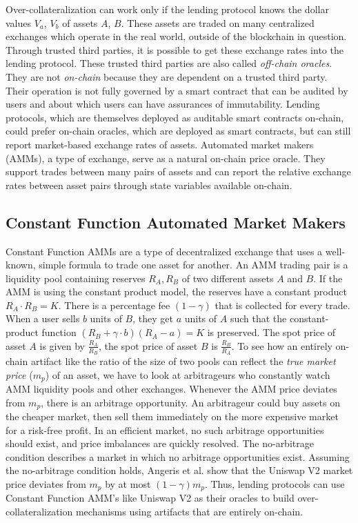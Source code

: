 Over-collateralization can work only if the lending protocol knows the dollar values $V_a$, $V_b$ of assets $A$, $B$. These assets are traded on many centralized exchanges which operate in the real world, outside of the blockchain in question. Through trusted third parties, it is possible to get these exchange rates into the lending protocol. These trusted third parties are also called \textit{off-chain oracles}. They are not \textit{on-chain} because they are dependent on a trusted third party. Their operation is not fully governed by a smart contract that can be audited by users and about which users can have assurances of immutability. Lending protocols, which are themselves deployed as auditable smart contracts on-chain, could prefer on-chain oracles, which are deployed as smart contracts, but can still report market-based exchange rates of assets. Automated market makers (AMMs), a type of exchange, serve as a natural on-chain price oracle. They support trades between many pairs of assets and can report the relative exchange rates between asset pairs through state variables available on-chain. 

\subsection{Constant Function Automated Market Makers}
Constant Function AMMs \cite{Zhang2018UniV1} are a type of decentralized exchange that uses a well-known, simple formula to trade one asset for another. An AMM trading pair is a liquidity pool containing reserves $R_A, R_B$ of two different assets $A$ and $B$. If the AMM is using the constant product model, the reserves have a constant product $R_A \cdot R_B = K$. There is a percentage fee $(1 - \gamma)$ that is collected for every trade. When a user sells $b$ units of $B$, they get $a$ units of $A$ such that the constant-product function $(R_B + \gamma \cdot b) (R_A - a) = K$ is preserved. The spot price of asset $A$ is given by $\frac{R_A}{R_B}$, the spot price of asset $B$ is $\frac{R_B}{R_A}$. To see how an entirely on-chain artifact like the ratio of the size of two pools can reflect the \textit{true market price} ($m_p$) of an asset, we have to look at arbitrageurs who constantly watch AMM liquidity pools and other exchanges. Whenever the AMM price deviates from $m_p$, there is an arbitrage opportunity. An arbitrageur could buy assets on the cheaper market, then sell them immediately on the more expensive market for a risk-free profit. In an efficient market, no such arbitrage opportunities should exist, and price imbalances are quickly resolved. The no-arbitrage condition describes a market in which no arbitrage opportunities exist.  Assuming the no-arbitrage condition holds, Angeris et al. \cite{angeris2019uniswap} show that the Uniswap V2 market price deviates from $m_p$ by at most $(1-\gamma)m_p$. Thus, lending protocols can use Constant Function AMM's like Uniswap V2 as their oracles to build over-collateralization mechanisms using artifacts that are entirely on-chain. 

